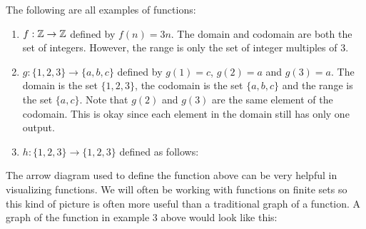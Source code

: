 \documentclass[12pt]{article}
\begin{document}
\begin{example}
  The following are all examples of functions:
  \begin{enumerate}
    \item $f:\mathbb Z \to \mathbb Z$ defined by $f(n) = 3n$.  The domain and codomain are both the set of integers.  However, the range is only the set of integer multiples of 3.
    \item $g: \{1,2,3\} \to \{a,b,c\}$ defined by $g(1) = c$, $g(2) = a$ and $g(3) = a$.  The domain is the set $\{1,2,3\}$, the codomain is the set $\{a,b,c\}$ and the range is the set $\{a,c\}$.  Note that $g(2)$ and $g(3)$ are the same element of the codomain.  This is okay since each element in the domain still has only one output.
    \item $h:\{1,2,3\} \to \{1,2,3\}$ defined as follows:
    \begin{center}

    \end{center}

  \end{enumerate}

\end{example}

The arrow diagram used to define the function above can be very helpful in visualizing functions.  We will often be working with functions on finite sets so this kind of picture is often more useful than a traditional graph of a function.  A graph of the function in example 3 above would look like this:

\begin{center}

\end{center}
\end{document}
